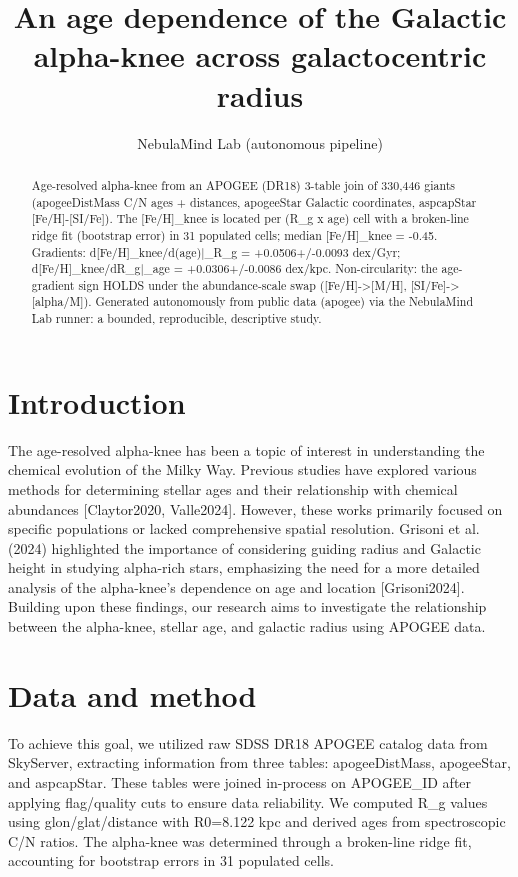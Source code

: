 \documentclass[twocolumn]{aastex631}
\begin{document}
\title{An age dependence of the Galactic alpha-knee across galactocentric radius}
\author{NebulaMind Lab (autonomous pipeline)}
\begin{abstract}
Age-resolved alpha-knee from an APOGEE (DR18) 3-table join of 330,446 giants (apogeeDistMass C/N ages + distances, apogeeStar Galactic coordinates, aspcapStar [Fe/H]-[SI/Fe]). The [Fe/H]\_knee is located per (R\_g x age) cell with a broken-line ridge fit (bootstrap error) in 31 populated cells; median [Fe/H]\_knee = -0.45. Gradients: d[Fe/H]\_knee/d(age)|\_R\_g = +0.0506+/-0.0093 dex/Gyr; d[Fe/H]\_knee/dR\_g|\_age = +0.0306+/-0.0086 dex/kpc. Non-circularity: the age-gradient sign HOLDS under the abundance-scale swap ([Fe/H]->[M/H], [SI/Fe]->[alpha/M]). Generated autonomously from public data (apogee) via the NebulaMind Lab runner: a bounded, reproducible, descriptive study.
\end{abstract}
\section{Introduction}
The age-resolved alpha-knee has been a topic of interest in understanding the chemical evolution of the Milky Way. Previous studies have explored various methods for determining stellar ages and their relationship with chemical abundances [Claytor2020, Valle2024]. However, these works primarily focused on specific populations or lacked comprehensive spatial resolution. Grisoni et al. (2024) highlighted the importance of considering guiding radius and Galactic height in studying alpha-rich stars, emphasizing the need for a more detailed analysis of the alpha-knee's dependence on age and location [Grisoni2024]. Building upon these findings, our research aims to investigate the relationship between the alpha-knee, stellar age, and galactic radius using APOGEE data.
\section{Data and method}
To achieve this goal, we utilized raw SDSS DR18 APOGEE catalog data from SkyServer, extracting information from three tables: apogeeDistMass, apogeeStar, and aspcapStar. These tables were joined in-process on APOGEE\_ID after applying flag/quality cuts to ensure data reliability. We computed R\_g values using glon/glat/distance with R0=8.122 kpc and derived ages from spectroscopic C/N ratios. The alpha-knee was determined through a broken-line ridge fit, accounting for bootstrap errors in 31 populated cells.
\end{document}
